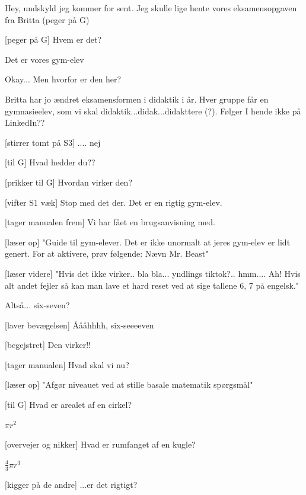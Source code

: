 \documentclass[a4paper,11pt]{article}
\begin{document}
\begin{sketch}

 Hey, undskyld jeg kommer for sent. Jeg skulle lige hente vores eksamensopgaven fra Britta (peger på G)


[peger på G] Hvem er det?

 Det er vores gym-elev

 Okay... Men hvorfor er den her?

 Britta har jo ændret eksamensformen i didaktik i år. Hver gruppe får en gymnasieelev, som vi skal didaktik...didak...didakttere (?). Følger I hende ikke på LinkedIn??

[stirrer tomt på S3] .... nej 

[til G] Hvad hedder du??

[prikker til G] Hvordan virker den?

[vifter S1 væk] Stop med det der. Det er en rigtig gym-elev.

[tager manualen frem] Vi har fået en brugsanvisning med. 

[læser op] "Guide til gym-elever. Det er ikke unormalt at jeres gym-elev er lidt genert. For at aktivere, prøv følgende: Nævn Mr. Beast"


[læser videre] "Hvis det ikke virker.. bla bla... yndlings tiktok?.. hmm.... Ah! Hvis alt andet fejler så kan man lave et hard reset ved at sige tallene 6, 7 på engelsk."

 Altså... six-seven?

[laver bevægelsen] Åååhhhh, six-seeeeven

[begejstret] Den virker!!

[tager manualen] Hvad skal vi nu?

[læser op] "Afgør niveauet ved at stille basale matematik spørgsmål"

[til G] Hvad er arealet af en cirkel?

 $\pi r^2$

[overvejer og nikker] Hvad er rumfanget af en kugle?

 $\tfrac{4}{3}\pi r^3$

[kigger på de andre] ...er det rigtigt?


\end{sketch}
\end{document}
